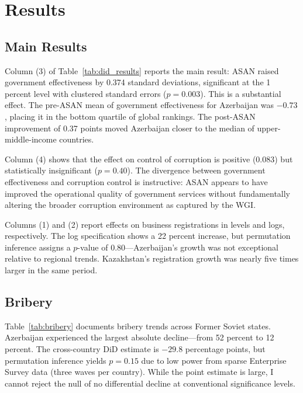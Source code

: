 \documentclass[12pt]{article}
\begin{document}
\section{Results}

\subsection{Main Results}



Column (3) of Table~\ref{tab:did_results} reports the main result: ASAN raised government effectiveness by 0.374 standard deviations, significant at the 1 percent level with clustered standard errors ($p = 0.003$). This is a substantial effect. The pre-ASAN mean of government effectiveness for Azerbaijan was $-0.73$, placing it in the bottom quartile of global rankings. The post-ASAN improvement of 0.37 points moved Azerbaijan closer to the median of upper-middle-income countries.

Column (4) shows that the effect on control of corruption is positive (0.083) but statistically insignificant ($p = 0.40$). The divergence between government effectiveness and corruption control is instructive: ASAN appears to have improved the operational quality of government services without fundamentally altering the broader corruption environment as captured by the WGI.

Columns (1) and (2) report effects on business registrations in levels and logs, respectively. The log specification shows a 22 percent increase, but permutation inference assigns a $p$-value of 0.80---Azerbaijan's growth was not exceptional relative to regional trends. Kazakhstan's registration growth was nearly five times larger in the same period.

\subsection{Bribery}



Table~\ref{tab:bribery} documents bribery trends across Former Soviet states. Azerbaijan experienced the largest absolute decline---from 52 percent to 12 percent. The cross-country DiD estimate is $-29.8$ percentage points, but permutation inference yields $p = 0.15$ due to low power from sparse Enterprise Survey data (three waves per country). While the point estimate is large, I cannot reject the null of no differential decline at conventional significance levels.
\end{document}
